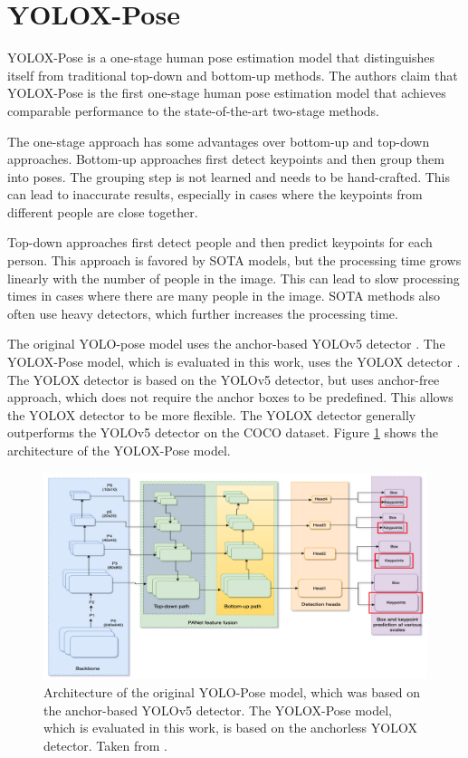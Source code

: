 \section{YOLOX-Pose}
\label{yolox-pose}

YOLOX-Pose  is a one-stage human pose estimation model that distinguishes itself from traditional top-down and bottom-up methods. The authors claim that YOLOX-Pose is the first one-stage human pose estimation model that achieves comparable performance to the state-of-the-art two-stage methods.

The one-stage approach has some advantages over bottom-up and top-down approaches. Bottom-up approaches first detect keypoints and then group them into poses. The grouping step is not learned and needs to be hand-crafted. This can lead to inaccurate results, especially in cases where the keypoints from different people are close together.

Top-down approaches first detect people and then predict keypoints for each person. This approach is favored by SOTA models, but the processing time grows linearly with the number of people in the image. This can lead to slow processing times in cases where there are many people in the image. SOTA methods also often use heavy detectors, which further increases the processing time.



The original YOLO-pose \cite{yoloPose} model uses the anchor-based YOLOv5 detector \cite{yolov5}. The YOLOX-Pose model, which is evaluated in this work, uses the YOLOX detector \cite{yolox}. The YOLOX detector is based on the YOLOv5 detector, but uses anchor-free approach, which does not require the anchor boxes to be predefined. This allows the YOLOX detector to be more flexible. The YOLOX detector generally outperforms the YOLOv5 detector on the COCO dataset. Figure \ref{fig:yolopose_architecture} shows the architecture of the YOLOX-Pose model.

\begin{figure}[htbp]
    \centering
    \includegraphics[width=\textwidth]{obrazky-figures/yolopose_architecture.png}
    \caption{Architecture of the original YOLO-Pose model, which was based on the anchor-based YOLOv5 detector. The YOLOX-Pose model, which is evaluated in this work, is based on the anchorless YOLOX detector. Taken from \cite{yoloPose}.}
    \label{fig:yolopose_architecture}
\end{figure}

